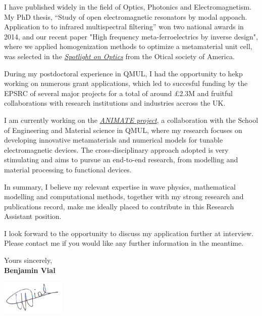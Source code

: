 \documentclass{academia}
\begin{document}
I have published widely in the field of Optics, Photonics
and Electromagnetism.
My PhD thesis, “Study of open electromagnetic resonators by modal appoach. 
Application to to infrared multispectral filtering” won two national awards in 2014, and
our recent paper "High frequency meta-ferroelectrics by inverse design", where we applied 
homogenization methods to optimize a metamaterial unit cell, was selected
in the \textit{\href{https://www.osapublishing.org/spotlight/summary.cfm?id=450295}{Spotlight on Optics}}
from the Otical society of America.


During my postdoctoral experience in QMUL, I had the
opportunity to hekp working on numerous grant applications, which led to succesful funding by the EPSRC of several major projects
for a total of around £2.3M and fruitful collaborations with research institutions
and industries accross the UK.

I am currently working on the \textit{\href{https://animate-research.com/}{ANIMATE project}},
a collaboration with the School of Engineering and Material science in QMUL,
where my research focuses on developing innovative metamaterials and
numerical models for tunable electromagnetic devices.
The cross-disciplinary approach adopted is very stimulating and aims to
pursue an end-to-end research, from modelling and material processing to
functional devices. 


In summary, I believe my relevant expertise in wave physics, mathematical modelling and 
computational methods, together with my strong research and publications record, make me ideally placed to contribute in this 
Research Assistant position.

I look forward to the opportunity to discuss my application further at
interview. Please contact me if you would like any further information
in the meantime.



Yours sincerely,\\[1.5em]


\textbf{Benjamin Vial}

\includegraphics[width=3cm]{sig.png}
%
\end{document}
